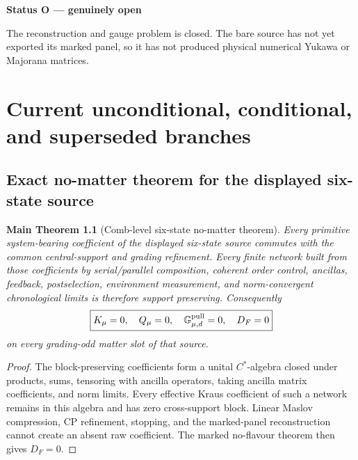 \documentclass[11pt,oneside,openany]{book}
\numberwithin{equation}{chapter}
\newtheorem{maintheorem}[theorem]{Main Theorem}
\theoremstyle{definition}
\theoremstyle{remark}
\newenvironment{statusbox}[2]{%
  \par\medskip\noindent
  \begin{center}\begin{minipage}{0.94\textwidth}
  \colorbox{#1!8}{\parbox{\dimexpr\linewidth-2\fboxsep\relax}{\textbf{#2}}}\par\smallskip
}{%
  \end{minipage}\end{center}\medskip
}
\newcommand{\Open}[1]{\begin{statusbox}{OpenColor}{Status O --- genuinely open}#1\end{statusbox}}
\begin{document}
\Open{The reconstruction and gauge problem is closed.  The bare source has not
yet exported its marked panel, so it has not produced physical numerical
Yukawa or Majorana matrices.}

\chapter{Current unconditional, conditional, and superseded branches}
\label{ch:v6-current-status}

\section{Exact no-matter theorem for the displayed six-state source}

\begin{maintheorem}[Comb-level six-state no-matter theorem]
\label{thm:v6-six-state-no-matter}
Every primitive system-bearing coefficient of the displayed six-state source
commutes with the common central-support and grading refinement.  Every finite
network built from those coefficients by serial/parallel composition,
coherent order control, ancillas, feedback, postselection, environment
measurement, and norm-convergent chronological limits is therefore support
preserving.  Consequently
\[
 \boxed{K_\mu=0,
 \quad Q_\mu=0,
 \quad \mathbb G_{\mu,d}^{\rm pull}=0,
 \quad D_F=0}
\]
on every grading-odd matter slot of that source.
\end{maintheorem}

\begin{proof}
The block-preserving coefficients form a unital \(C^*\)-algebra closed under
products, sums, tensoring with ancilla operators, taking ancilla matrix
coefficients, and norm limits.  Every effective Kraus coefficient of such a
network remains in this algebra and has zero cross-support block.  Linear
Maslov compression, CP refinement, stopping, and the marked-panel
reconstruction cannot create an absent raw coefficient.  The marked no-flavour
theorem then gives \(D_F=0\).
\end{proof}
\end{document}
